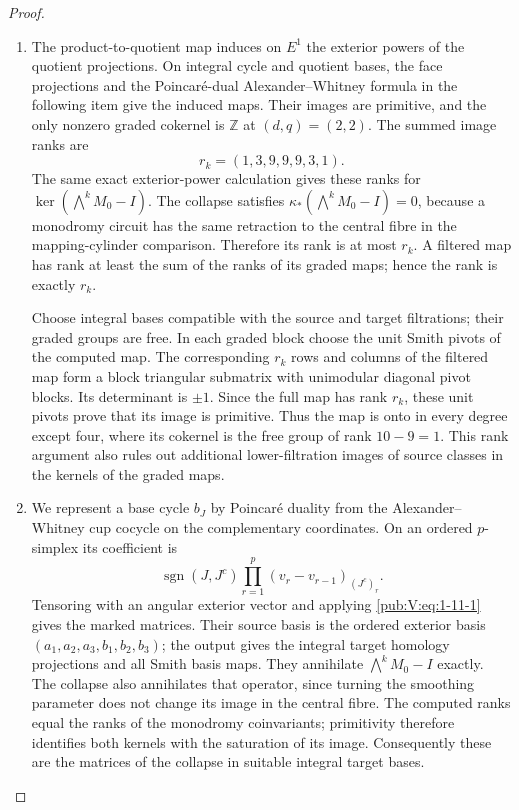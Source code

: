 \documentclass[11pt,a4paper]{article}
\numberwithin{equation}{section}
\theoremstyle{definition}
\begin{document}
\begin{proof}
\begin{enumerate}[label=\arabic*.]
\item The product-to-quotient map induces on $E^1$ the exterior powers of
the quotient projections.  On integral cycle and quotient bases, the face projections and the
Poincar\'e-dual Alexander--Whitney formula in the following item give the induced maps. Their images are primitive, and the only nonzero graded cokernel
is $\mathbb Z$ at $(d,q)=(2,2)$.  The summed image ranks are
\[
             r_k=(1,3,9,9,9,3,1).
\]
The same exact exterior-power calculation gives these ranks for
$\ker(\bigwedge^kM_0-I)$.
The collapse satisfies
$\kappa_*(\bigwedge^kM_0-I)=0$, because a monodromy circuit
has the same retraction to the central fibre in the mapping-cylinder
comparison.  Therefore its rank is at most $r_k$.
A filtered map has rank at least the sum of the ranks of its
graded maps; hence the rank is exactly $r_k$.

Choose integral bases compatible with the source and target
filtrations; their graded groups are free.  In each graded block
choose the unit Smith pivots of the computed map.  The corresponding
$r_k$ rows and columns of the filtered map form a block
triangular submatrix with unimodular diagonal pivot blocks.
Its determinant is $\pm1$.  Since the full map has rank $r_k$,
these unit pivots prove that its image is primitive.
Thus the map is onto in every degree except four, where its
cokernel is the free group of rank $10-9=1$.
This rank argument also rules out additional lower-filtration images
of source classes in the kernels of the graded maps.

\item We represent a base cycle $b_J$ by
Poincar\'e duality from the Alexander--Whitney cup cocycle on the
complementary coordinates.  On an ordered $p$-simplex its coefficient
is
\[
\operatorname{sgn}(J,J^c)
 \prod_{r=1}^p(v_r-v_{r-1})_{(J^c)_r}.
\]
Tensoring with an angular exterior vector and applying \eqref{pub:V:eq:1-11-1}
gives the marked matrices. Their source basis is the ordered exterior
basis $(a_1,a_2,a_3,b_1,b_2,b_3)$; the output gives the integral
target homology projections and all Smith basis maps.
They annihilate $\bigwedge^kM_0-I$ exactly.  The collapse also
annihilates that operator, since turning the smoothing parameter
does not change its image in the central fibre.  The computed ranks
equal the ranks of the monodromy coinvariants; primitivity therefore
identifies both kernels with the saturation of its image.
Consequently these are the matrices of the collapse in suitable integral target bases.


\end{enumerate}
\end{proof}
\end{document}
